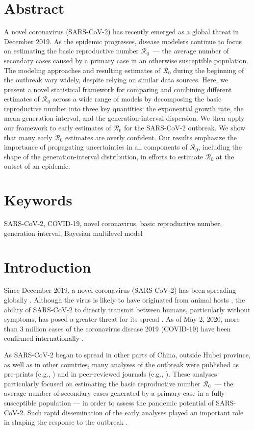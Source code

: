 \documentclass[12pt]{article}
\newcommand{\Ro}{\ensuremath{{\mathcal R}_{0}}\xspace}
\begin{document}
\section*{Abstract}
A novel coronavirus (SARS-CoV-2) has recently emerged as a global threat in December 2019. 
As the epidemic progresses, disease modelers continue to focus on estimating the basic reproductive number \Ro\ --- the average number of secondary cases caused by a primary case in an otherwise susceptible population.
The modeling approaches and resulting estimates of \Ro during the beginning of the outbreak vary widely, despite relying on similar data sources.
Here, we present a novel statistical framework for comparing and combining different estimates of \Ro across a wide range of models by decomposing the basic reproductive number into three key quantities: the exponential growth rate, the mean generation interval, and the generation-interval dispersion.
We then apply our framework to early estimates of \Ro for the SARS-CoV-2 outbreak.
We show that many early \Ro estimates are overly confident.
Our results emphasize the importance of propagating uncertainties in all components of \Ro, including the shape of the generation-interval distribution, in efforts to estimate \Ro at the outset of an epidemic.

\section*{Keywords}

SARS-CoV-2, COVID-19, novel coronavirus, basic reproductive number, generation interval, Bayesian multilevel model

\section{Introduction}

Since December 2019, a novel coronavirus (SARS-CoV-2) has been spreading globally \citep{pneumonia}.
Although the virus is likely to have originated from animal hosts \citep{andersen2020proximal}, the ability of SARS-CoV-2 to directly transmit between humans, particularly without symptoms, has posed a greater threat for its spread \citep{he2020temporal}.
As of May 2, 2020, more than 3 million cases of the coronavirus disease 2019 (COVID-19) have been confirmed internationally \citep{who103}.

As SARS-CoV-2 began to spread in other parts of China, outside Hubei province, as well as in other countries, many analyses of the outbreak were published as pre-prints (e.g., \cite{bedfordncov, imaincov, liuncov, majumderncov, readncov, zhaoncov}) and in peer-reviewed journals (e.g., \cite{li2020early, riou2020pattern, wu2020nowcasting, zhao2020preliminary}).
These analyses particularly focused on estimating the basic reproductive number \Ro\ --- the average number of secondary cases generated by a primary case in a fully susceptible population \citep{anderson1991infectious, diekmann1990definition} --- in order to assess the pandemic potential of SARS-CoV-2.
Such rapid dissemination of the early analyses played an important role in shaping the response to the outbreak \citep{majumder2020early}.
\end{document}
